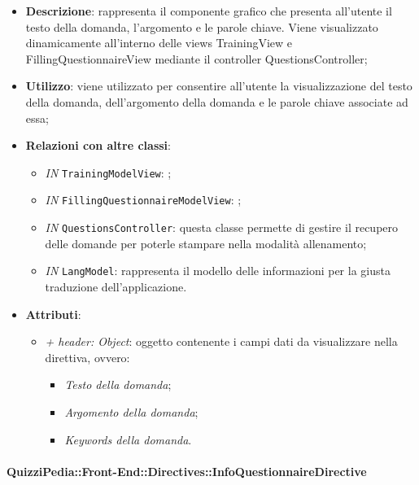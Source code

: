 		\begin{itemize}
			\item \textbf{Descrizione}: rappresenta il componente grafico che presenta all'utente il testo della domanda, l'argomento e le parole chiave. Viene visualizzato dinamicamente all'interno delle views TrainingView e FillingQuestionnaireView mediante il controller QuestionsController;
			\item \textbf{Utilizzo}: viene utilizzato per consentire all'utente la visualizzazione del testo della domanda, dell'argomento della domanda e le parole chiave associate ad essa;
			\item \textbf{Relazioni con altre classi}: 
			\begin{itemize}
				\item \textit{IN} \texttt{TrainingModelView}: ; 
				\item \textit{IN} \texttt{FillingQuestionnaireModelView}: ;
				\item \textit{IN} \texttt{QuestionsController}: questa classe permette di gestire il recupero delle domande per poterle stampare nella modalità allenamento;
				\item \textit{IN} \texttt{LangModel}: rappresenta il modello delle informazioni per la giusta traduzione dell'applicazione.
			\end{itemize}
			\item \textbf{Attributi}: 
			\begin{itemize}
				\item \textit{+ header: Object}: oggetto contenente i campi dati da visualizzare nella direttiva, ovvero:
				\begin{itemize}
					\item \textit{Testo della domanda};
					\item \textit{Argomento della domanda};
					\item \textit{Keywords della domanda}.
				\end{itemize}
			\end{itemize}
		\end{itemize}
		
		\paragraph{QuizziPedia::Front-End::Directives::InfoQuestionnaireDirective}
		
		\label{QuizziPedia::Front-End::Directives::InfoQuestionnaireDirective}
		
